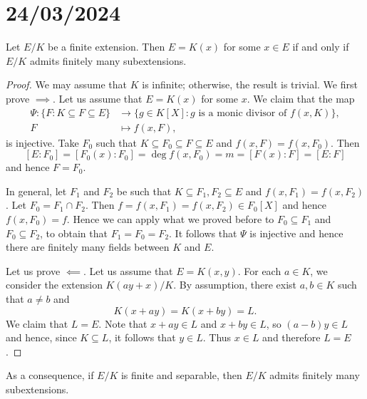 \section{24/03/2024}


\begin{proposition}
    Let $E/K$ be a finite extension. Then $E=K(x)$ for some $x\in E$ 
    if and only if $E/K$ admits finitely many subextensions. 
\end{proposition}

\begin{proof}
     We may assume that $K$ is infinite; otherwise, the result is trivial. 
    We first prove $\implies$. 
    Let us 
    assume that $E=K(x)$ for some $x$. We claim that the map
    \begin{align*}
    \Psi\colon \{F:K\subseteq F\subseteq E\}&\to\{g\in K[X]:g\text{ is a monic divisor of $f(x,K)$}\},\\
    F&\mapsto f(x,F),
    \end{align*}
    is injective. 
    Take $F_0$ such that $K\subseteq F_0\subseteq F\subseteq E$ and  
    $f(x,F)=f(x,F_0)$. Then  
    \[
    [E:F_0]=[F_0(x):F_0]=\deg f(x,F_0)=m=[F(x):F]=[E:F]
    \]
    and hence $F=F_0$.
    
    In general, let  $F_1$ and $F_2$ be such that 
    $K\subseteq F_1,F_2\subseteq E$ and $f(x,F_1)=f(x,F_2)$.
    Let $F_0=F_1\cap F_2$. 
    Then $f=f(x,F_1)=f(x,F_2)\in F_0[X]$ and hence $f(x,F_0)=f$.
    Hence we can apply what we proved before to $F_0\subseteq F_1$
    and $F_0\subseteq F_2$, to obtain that $F_1=F_0=F_2$.
    It follows that $\Psi$ is injective 
    and hence there are finitely many fields between $K$ and $E$. 
    
    Let us prove $\impliedby$.  
    Let us assume that $E=K(x,y)$. For each $a\in K$, we consider
    the extension $K(ay+x)/K$. By assumption, there exist $a,b\in K$ such that
    $a\ne b$ and 
    \[
    K(x+ay)=K(x+by)=L.
    \]
    We claim that $L=E$. Note that 
    $x+ay\in L$ and $x+by\in L$, so $(a-b)y\in L$ and hence, since $K\subseteq L$, it follows that
    $y\in L$. Thus $x\in L$ and therefore $L=E$. 
\end{proof}

As a consequence, if $E/K$ is finite and separable, then $E/K$ admits
finitely many subextensions. 

